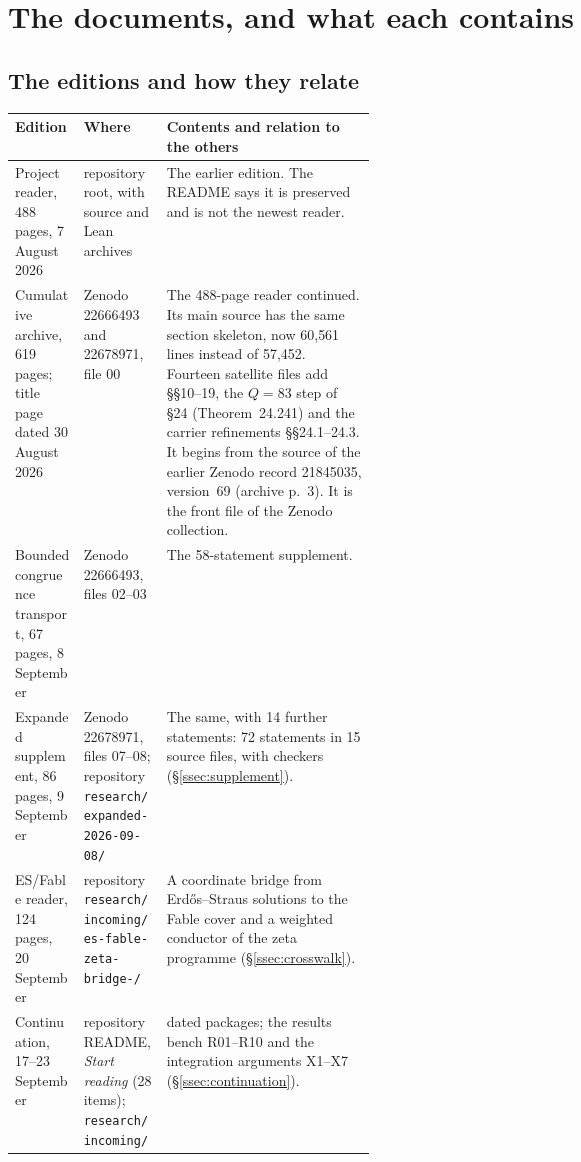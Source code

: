 \section{The documents, and what each contains}\label{sec:corpus}

\subsection{The editions and how they relate}

\begin{center}\small
\begin{tabularx}{\linewidth}{@{}>{\raggedright\arraybackslash}p{0.19\linewidth}>{\raggedright\arraybackslash}p{0.23\linewidth}>{\raggedright\arraybackslash}X@{}}
\toprule
Edition & Where & Contents and relation to the others\\
\midrule
Project reader, 488 pages, 7 August 2026 & repository root, with source and Lean archives & The earlier edition. The README says it is preserved and is not the newest reader.\\
Cumulative archive, 619 pages; title page dated 30 August 2026 & Zenodo 22666493 and 22678971, file 00 & The 488-page reader continued. Its main source has the same section skeleton, now 60{,}561 lines instead of 57{,}452. Fourteen satellite files add §§10--19, the $Q=83$ step of §24 (Theorem~24.241) and the carrier refinements §§24.1--24.3. It begins from the source of the earlier Zenodo record 21845035, version~69 (archive p.~3). It is the front file of the Zenodo collection.\\
Bounded congruence transport, 67 pages, 8 September & Zenodo 22666493, files 02--03 & The 58-statement supplement.\\
Expanded supplement, 86 pages, 9 September & Zenodo 22678971, files 07--08; repository \texttt{research/\allowbreak expanded-2026-09-08/} & The same, with 14 further statements: 72 statements in 15 source files, with checkers (§\ref{ssec:supplement}).\\
ES/Fable reader, 124 pages, 20 September & repository \texttt{research/\allowbreak incoming/\allowbreak es-fable-zeta-bridge-\allowbreak 20260920/} & A coordinate bridge from Erdős--Straus solutions to the Fable cover and a weighted conductor of the zeta programme (§\ref{ssec:crosswalk}).\\
Continuation, 17--23 September & repository README, \emph{Start reading} (28 items); \texttt{research/\allowbreak incoming/} & 41 dated packages; the results bench R01--R10 and the integration arguments X1--X7 (§\ref{ssec:continuation}).\\
\bottomrule
\end{tabularx}
\end{center}

